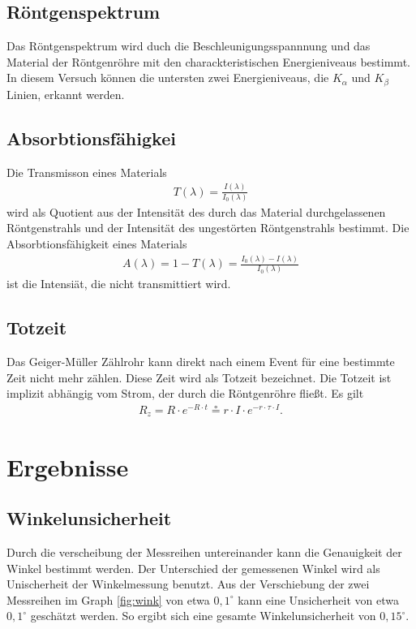 \documentclass[11pt, a4paper]{article}
\begin{document}
    \subsection{Röntgenspektrum}

    Das Röntgenspektrum wird duch die Beschleunigungsspannnung und das Material der Röntgenröhre mit den charackteristischen Energieniveaus bestimmt. In diesem Versuch können die untersten zwei Energieniveaus, die $K_{\alpha}$ und $K_{\beta}$ Linien, erkannt werden.
    \subsection{Absorbtionsfähigkei}

    Die Transmisson eines Materials
    \begin{align}
        T(\lambda) = \frac{I(\lambda)}{I_{0}(\lambda)} \label{eq:transmission}
    \end{align}
    wird als Quotient aus der Intensität des durch das Material durchgelassenen Röntgenstrahls und der Intensität des ungestörten Röntgenstrahls bestimmt. Die Absorbtionsfähigkeit eines Materials
    \begin{align}
        A(\lambda) = 1 - T(\lambda) = \frac{I_{0}(\lambda) - I(\lambda)}{I_{0}(\lambda)}
    \end{align}
    ist die Intensiät, die nicht transmittiert wird.

    \subsection{Totzeit}
    Das Geiger-Müller Zählrohr kann direkt nach einem Event für eine bestimmte Zeit nicht mehr zählen. Diese Zeit wird als Totzeit bezeichnet. Die Totzeit ist implizit abhängig vom Strom, der durch die Röntgenröhre fließt. Es gilt
    \begin{align}
        R_{z} = R \cdot e^{-R \cdot t} \circeq r \cdot I \cdot e^{-r \cdot \tau \cdot I}. \label{eq:totzeit}
    \end{align}

    \section{Ergebnisse}

    \subsection{Winkelunsicherheit}
    Durch die verscheibung der Messreihen untereinander kann die Genauigkeit der Winkel bestimmt werden. Der Unterschied der gemessenen Winkel wird als Unischerheit der Winkelmessung benutzt. Aus der Verschiebung der zwei Messreihen im Graph \ref{fig:wink} von etwa $0,1^{\circ}$ kann eine Unsicherheit von etwa $0,1^{\circ}$ geschätzt werden. So ergibt sich eine gesamte Winkelunsicherheit von $0,15^{\circ}$.
\end{document}
